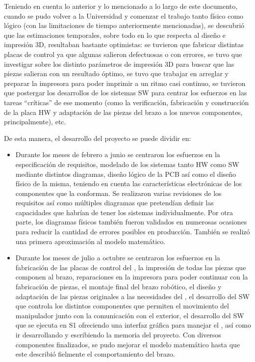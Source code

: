Teniendo en cuenta lo anterior y lo mencionado a lo largo de este documento, cuando
se pudo volver a la Universidad y comenzar el trabajo tanto físico como lógico
(con las limitaciones de tiempo anteriormente mencionadas), se descubrió que las
estimaciones temporales, sobre todo en lo que respecta al diseño e impresión 3D,
resultaban bastante optimistas: se tuvieron que fabricar distintas placas de
control ya que algunas salieron defectuosas o con errores, se tuvo que investigar sobre los
distinto parámetros de impresión 3D para buscar que las piezas salieran con un 
resultado óptimo, se tuvo que trabajar en arreglar y preparar la impresora para
poder imprimir a un ritmo casi continuo, se tuvieron que postergar los desarrollos
de los sistemas \ac{SW} para centrar los esfuerzos en las tareas ``críticas'' de
ese momento (como la verificación, fabricación y construcción de la placa \ac{HW} y 
adaptación de las piezas del brazo a los nuevos componentes, principalmente), etc.

De esta manera, el desarrollo del proyecto se puede dividir en:
\begin{itemize}
    \item Durante los meses de febrero a junio se centraron los esfuerzos en la
    especificación de requisitos, modelado de los sistemas tanto \ac{HW} como
    \ac{SW} mediante distintos diagramas, diseño lógico de la \ac{PCB} así como
    el diseño físico de la misma, teniendo en cuenta las características electrónicas
    de los componentes que la conforman. Se realizaron varias revisiones de los
    requisitos así como múltiples diagramas que pretendían definir
    las capacidades que habrían de tener los sistemas individualmente. Por otra
    parte, los diagramas físicos también fueron validados en numerosas ocasiones
    para reducir la cantidad de errores posibles en producción. También se realizó
    una primera aproximación al modelo matemático.

    \item Durante los meses de julio a octubre se centraron los esfuerzos en
    la fabricación de las placas de control del \pArm{}, la impresión de todas
    las piezas que componen al brazo, reparaciones en la impresora para poder
    continuar con la fabricación de piezas, el montaje final del brazo robótico,
    el diseño y adaptación de las piezas originales a las necesidades del \pArm{},
    el desarrollo del \ac{SW} que controla los distintos componentes que permiten
    el movimiento del manipulador junto con la comunicación con el exterior, 
    el desarrollo del \ac{SW} que se ejecuta en \ac{S1} ofreciendo una interfaz gráfica para manejar el \pArm{}, así como ir desarrollando y escribiendo la memoria 
    del proyecto. Con diversos componentes finalizados, se pudo mejorar el
    modelo matemático hasta que este describió fielmente el comportamiento del brazo.
\end{itemize}

